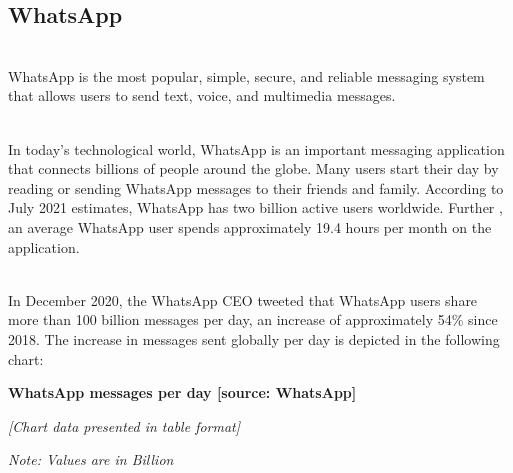 

\subsection{WhatsApp}\label{3NaDnAZX_j02qRe1JPcLf}
\\
WhatsApp is the most popular, simple, secure, and reliable messaging system that allows users to send text, voice, and multimedia messages.\\
\strut \\
In today's technological world, WhatsApp is an important messaging application that connects billions of people around the globe. Many users start their day by reading or sending WhatsApp messages to their friends and family. According to July 2021 estimates, WhatsApp has two billion active users worldwide. Further , an average WhatsApp user spends approximately 19.4 hours per month on the application.\\
\strut \\
In December 2020, the WhatsApp CEO tweeted that WhatsApp users share more than 100 billion messages per day, an increase of approximately 54\% since 2018. The increase in messages sent globally per day is depicted in the following chart:

\textbf{WhatsApp messages per day [source: WhatsApp]}

\textit{\small [Chart data presented in table format]}

\begin{table}[htbp]
\centering
\small
{}
\caption{The increase in messages communicated per day each year}
\label{tab:chart}

\textit{\small Note: Values are in Billion}
\end{table}

